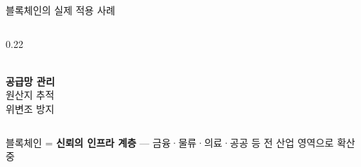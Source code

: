 \documentclass[10pt, aspectratio=169]{beamer}
\begin{document}
\begin{frame}{블록체인의 실제 적용 사례}
\begin{columns}[T]
\begin{column}{0.22\textwidth}
\begin{tcolorbox}[
                colback=warnAmber!10, colframe=warnAmber!80,
                fontupper=\sffamily\scriptsize, arc=5pt,
                halign=center, valign=center, height=4.5cm
            ]
            {\large\faTruck}\\[0.2cm]
            \textbf{공급망 관리}\\[0.2cm]
            원산지 추적\\위변조 방지
            \end{tcolorbox}
        \end{column}
    \end{columns}
    \vspace{0.3cm}
    \begin{center}
        {\small\color{midSlate}
        블록체인 = \textbf{신뢰의 인프라 계층} — 금융·물류·의료·공공 등 전 산업 영역으로 확산 중}
    \end{center}
\end{frame}



\end{document}
